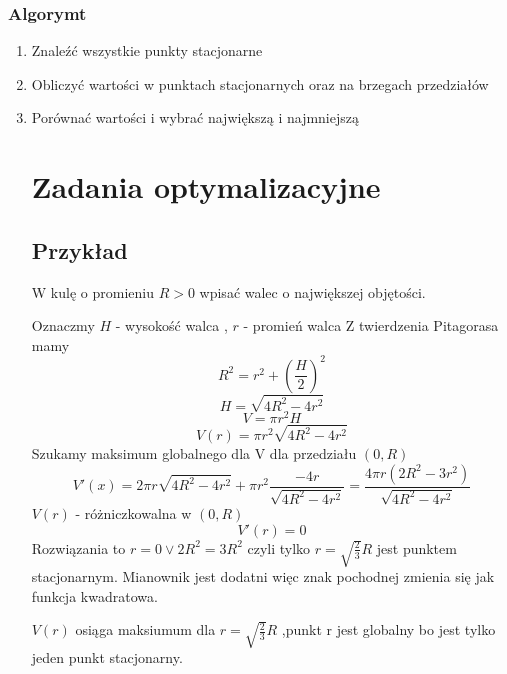 \documentclass{article}
\begin{document}
\subsubsection{Algorymt}
\begin{enumerate}
\item{Znaleźć wszystkie punkty stacjonarne}
\item{Obliczyć wartości w punktach stacjonarnych oraz na brzegach przedziałów}
\item{Porównać wartości i wybrać największą i najmniejszą }

\section{Zadania optymalizacyjne}
\subsection{Przykład}
W kulę o promieniu $R > 0$ wpisać walec o największej objętości.

Oznaczmy $H$ - wysokość walca , $r$ - promień walca
Z twierdzenia Pitagorasa mamy
$$ R^2 = r^2 + \left(\frac{H}{2}\right)^2 $$
$$ H = \sqrt{4R^2 - 4r^2}$$
$$ V = \pi r^2 H$$
$$ V(r) = \pi r^2 \sqrt{4R^2 - 4r^2} $$
Szukamy maksimum globalnego dla V dla przedziału $(0,R)$
$$ V'(x) = 2\pi r \sqrt{4R^2 - 4r^2} + \pi r^2  \frac{-4r}{\sqrt{4R^2 - 4r^2}} = \frac{4\pi r ( 2R^2 - 3r^2)}{\sqrt{4R^2 - 4r^2}} $$
$V(r)$ - różniczkowalna w $(0,R)$
$$V'(r) = 0 $$
Rozwiązania to $r = 0 \vee 2R^2 = 3R^2$ czyli tylko $r=\sqrt{\frac{2}{3}}R$ jest punktem stacjonarnym.
Mianownik jest dodatni więc znak pochodnej zmienia się jak funkcja kwadratowa.

$V(r)$ osiąga maksiumum dla $r = \sqrt{\frac{2}{3}}R$
,punkt r jest globalny bo jest tylko jeden punkt stacjonarny.
\end{enumerate}
\end{document}
